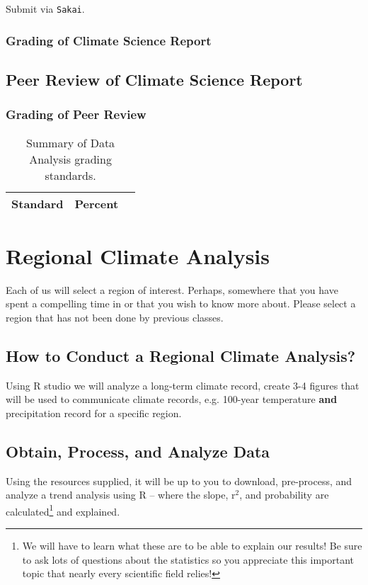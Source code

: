\documentclass{article}\usepackage[]{graphicx}\usepackage[]{color}
\begin{document}
Submit via \texttt{Sakai}.

\subsubsection{Grading of Climate Science Report}


\subsection{Peer Review of Climate Science Report}

\subsubsection{Grading of Peer Review}


\begin{table}[h]
\caption{Summary of Data Analysis grading standards.}
\label{tab:litreviewgrading}
\begin{tabular}{lll}\hline
Standard      &   Percent   & \\ \hline\hline
\hline
\end{tabular}
\end{table}



\section{Regional Climate Analysis}

Each of us will select a region of interest. Perhaps, somewhere that you have spent a compelling time in or that you wish to know more about. Please select a region that has not been done by previous classes. 

\subsection{How to Conduct a Regional Climate Analysis?}

Using R studio we will analyze a long-term climate record, create 3-4 figures that will be used to communicate climate records, e.g. 100-year temperature \textbf{and} precipitation record for a specific region. 

\subsection{Obtain, Process, and Analyze Data}

Using the resources supplied, it will be up to you to download, pre-process, and analyze a trend analysis using R -- where the slope, r$^2$, and probability are calculated\footnote{We will have to learn what these are to be able to explain our results! Be sure to ask lots of questions about the statistics so you appreciate this important topic that nearly every scientific field relies!} and explained. 
\end{document}
